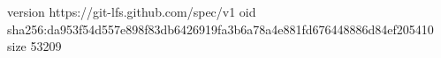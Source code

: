 version https://git-lfs.github.com/spec/v1
oid sha256:da953f54d557e898f83db6426919fa3b6a78a4e881fd676448886d84ef205410
size 53209
